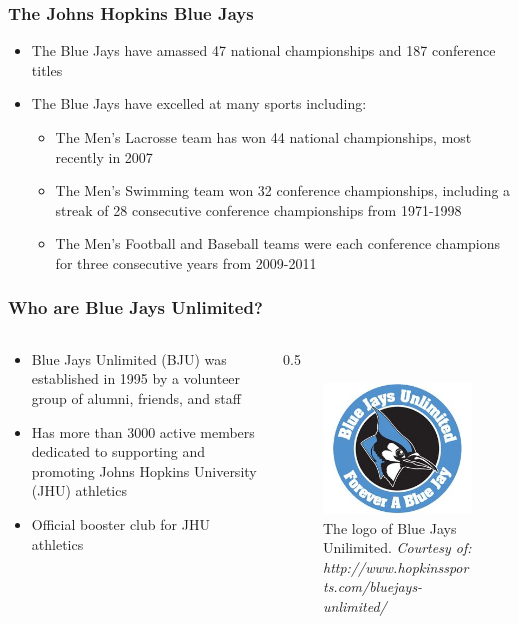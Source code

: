 \documentclass[compress,handout,10pt]{beamer}
\let\olditem\item
\renewcommand{\item}{\setlength{\itemsep}{0.5\baselineskip}\olditem}
\begin{document}
\begin{frame}
	\frametitle{The Johns Hopkins Blue Jays}
		\begin{itemize}
			\item The Blue Jays have amassed 47 national championships and 187 conference titles \cite{hopathletic}
			\item The Blue Jays have excelled at many sports including:
			\begin{itemize}
				\item The Men's Lacrosse team has won 44 national championships, most recently in 2007 \cite{hopathletic}
				\item The Men's Swimming team won 32 conference championships, including a streak of 28 consecutive conference championships from 1971-1998 \cite{hopathletic}
				\item The Men's Football and Baseball teams were each conference champions for three consecutive years from 2009-2011 \cite{hopathletic}
		\end{itemize}
	\end{itemize}
\end{frame}

\begin{frame}
	\frametitle{Who are Blue Jays Unlimited?}
		\begin {columns}
			\begin{column}{0.5\textwidth}
				\begin {itemize}
					\item Blue Jays Unlimited (BJU) was established in 1995 \cite{bjuwebsite} by a volunteer group of alumni, friends, and staff
					\item Has more than 3000 active members dedicated to supporting and promoting Johns Hopkins University (JHU) athletics \cite{bjuwebsite}
					\item Official booster club for JHU athletics \cite{bjuwebsite}
				\end {itemize}
			\end {column}
			\begin {column}{0.5\textwidth}
				\begin{figure} [h]
					\begin{center}
						\includegraphics [width=2in] {BJU.jpg}
						\caption {{\tiny The logo of Blue Jays Unilimited. \textit{Courtesy of: http://www.hopkinssports.com/bluejays-unlimited/}}}
					\end{center}
				\end {figure}
			\end {column}
		\end{columns}
\end{frame}
\end{document}
